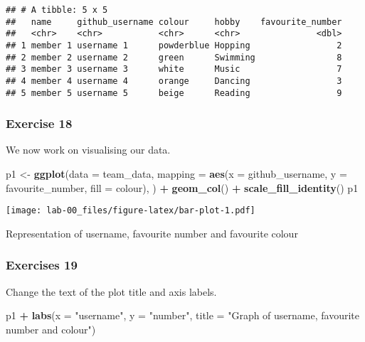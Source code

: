 \documentclass[
]{article}
\newenvironment{Shaded}{\begin{snugshade}}{\end{snugshade}}
\newcommand{\AttributeTok}[1]{\textcolor[rgb]{0.13,0.29,0.53}{#1}}
\newcommand{\FunctionTok}[1]{\textcolor[rgb]{0.13,0.29,0.53}{\textbf{#1}}}
\newcommand{\NormalTok}[1]{#1}
\newcommand{\OtherTok}[1]{\textcolor[rgb]{0.56,0.35,0.01}{#1}}
\newcommand{\SpecialCharTok}[1]{\textcolor[rgb]{0.81,0.36,0.00}{\textbf{#1}}}
\newcommand{\StringTok}[1]{\textcolor[rgb]{0.31,0.60,0.02}{#1}}
\begin{document}
\begin{verbatim}
## # A tibble: 5 x 5
##   name     github_username colour     hobby    favourite_number
##   <chr>    <chr>           <chr>      <chr>               <dbl>
## 1 member 1 username 1      powderblue Hopping                 2
## 2 member 2 username 2      green      Swimming                8
## 3 member 3 username 3      white      Music                   7
## 4 member 4 username 4      orange     Dancing                 3
## 5 member 5 username 5      beige      Reading                 9
\end{verbatim}

\hypertarget{exercise-18}{%
\subsubsection{Exercise 18}\label{exercise-18}}

We now work on visualising our data.

\begin{Shaded}
\begin{Highlighting}[]
\NormalTok{p1 }\OtherTok{\textless{}{-}} \FunctionTok{ggplot}\NormalTok{(}\AttributeTok{data =}\NormalTok{ team\_data, }
             \AttributeTok{mapping =} \FunctionTok{aes}\NormalTok{(}\AttributeTok{x =}\NormalTok{ github\_username, }
                           \AttributeTok{y =}\NormalTok{ favourite\_number,}
                           \AttributeTok{fill =}\NormalTok{ colour), }
\NormalTok{             ) }\SpecialCharTok{+}
   \FunctionTok{geom\_col}\NormalTok{() }\SpecialCharTok{+}
   \FunctionTok{scale\_fill\_identity}\NormalTok{()}
\NormalTok{p1}
\end{Highlighting}
\end{Shaded}

\texttt{[image: lab-00\_files/figure-latex/bar-plot-1.pdf]}

Representation of username, favourite number and favourite colour

\hypertarget{exercises-19}{%
\subsubsection{Exercises 19}\label{exercises-19}}

Change the text of the plot title and axis labels.

\begin{Shaded}
\begin{Highlighting}[]
\NormalTok{p1 }\SpecialCharTok{+} \FunctionTok{labs}\NormalTok{(}\AttributeTok{x =} \StringTok{"username"}\NormalTok{, }
          \AttributeTok{y =} \StringTok{"number"}\NormalTok{,}
          \AttributeTok{title =} \StringTok{"Graph of username, favourite number and colour"}\NormalTok{)}
\end{Highlighting}
\end{Shaded}
\end{document}
